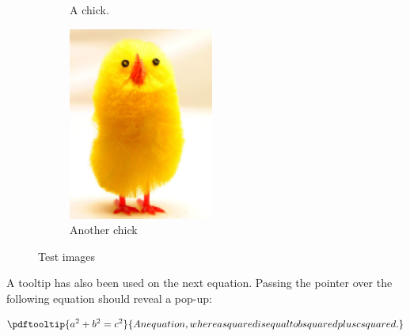 \documentclass[10pt,oneocolumn]{article}
\begin{document}
\begin{figure}
          \begin{subfigure}[b]{.55\linewidth}
            \centering
		{}
            \caption{A chick.}\label{fig:ChickWithAltText}
          \end{subfigure}%
          \begin{subfigure}[b]{.55\linewidth}
            \centering
		\includegraphics[height=2.5in]{Chick1}
            \caption{Another chick}\label{fig:ChickWithAltText2}
          \end{subfigure}
          \caption{Test images}
          \label{fig:AltTextImages}
\end{figure}

A tooltip has also been used on the next equation. Passing the pointer over the following equation should reveal a pop-up:

\begin{equation}
	{\pdftooltip{a^2+b^2=c^2}{An equation, where a squared is equal to b squared plus c squared.}}
\end{equation}
\end{document}

